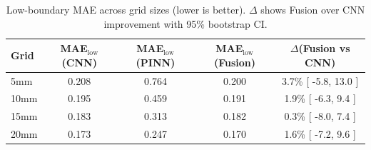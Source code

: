 \begin{table}[t]
\centering
\small
\begin{tabular}{lcccc}
\toprule
Grid & MAE$_{\text{low}}$(CNN) & MAE$_{\text{low}}$(PINN) & MAE$_{\text{low}}$(Fusion) & $\Delta$(Fusion vs CNN) \\
\midrule
5mm & 0.208 & 0.764 & 0.200 & 3.7\% [ -5.8, 13.0 ] \\
10mm & 0.195 & 0.459 & 0.191 & 1.9\% [ -6.3, 9.4 ] \\
15mm & 0.183 & 0.313 & 0.182 & 0.3\% [ -8.0, 7.4 ] \\
20mm & 0.173 & 0.247 & 0.170 & 1.6\% [ -7.2, 9.6 ] \\
\bottomrule
\end{tabular}
\caption{Low-boundary MAE across grid sizes (lower is better). $\Delta$ shows Fusion over CNN improvement with 95\% bootstrap CI.}
\label{tab:low_boundary_across_grids}
\end{table}